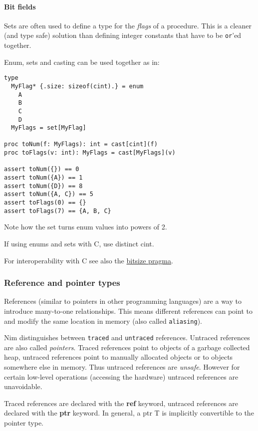 \hypertarget{bit-fields}{%
\paragraph{Bit fields}\label{bit-fields}}

Sets are often used to define a type for the \emph{flags} of a
procedure. This is a cleaner (and type safe) solution than defining
integer constants that have to be \texttt{or}'ed together.

Enum, sets and casting can be used together as in:

\begin{verbatim}
type
  MyFlag* {.size: sizeof(cint).} = enum
    A
    B
    C
    D
  MyFlags = set[MyFlag]

proc toNum(f: MyFlags): int = cast[cint](f)
proc toFlags(v: int): MyFlags = cast[MyFlags](v)

assert toNum({}) == 0
assert toNum({A}) == 1
assert toNum({D}) == 8
assert toNum({A, C}) == 5
assert toFlags(0) == {}
assert toFlags(7) == {A, B, C}
\end{verbatim}

Note how the set turns enum values into powers of 2.

If using enums and sets with C, use distinct cint.

For interoperability with C see also the
\href{manual.html\#implementation-specific-pragmas-bitsize-pragma}{bitsize
pragma}.

\hypertarget{reference-and-pointer-types}{%
\subsubsection{Reference and pointer
types}\label{reference-and-pointer-types}}

References (similar to pointers in other programming languages) are a
way to introduce many-to-one relationships. This means different
references can point to and modify the same location in memory (also
called \texttt{aliasing}).

Nim distinguishes between \texttt{traced} and \texttt{untraced}
references. Untraced references are also called \emph{pointers}. Traced
references point to objects of a garbage collected heap, untraced
references point to manually allocated objects or to objects somewhere
else in memory. Thus untraced references are \emph{unsafe}. However for
certain low-level operations (accessing the hardware) untraced
references are unavoidable.

Traced references are declared with the \textbf{ref} keyword, untraced
references are declared with the \textbf{ptr} keyword. In general, a
{ptr T} is implicitly convertible to the {pointer} type.

